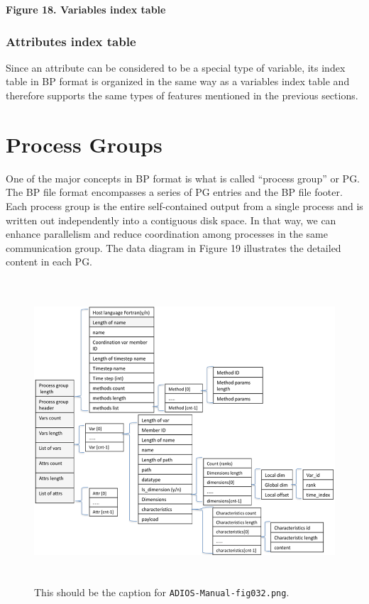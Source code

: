 \begin{center}
{\color{color20} \textbf{Figure 18. Variables index table}}
\end{center}

\subsubsection{Attributes index table}

Since an attribute can be considered to be a special type of variable, its index 
table in BP format is organized in the same way as a variables index table and 
therefore supports the same types of features mentioned in the previous sections. 

\section{Process Groups}

One of the major concepts in BP format is what is called ``process group'' or PG. 
The BP file format encompasses a series of PG entries and the BP file footer. Each 
process group is the entire self-contained output from a single process and is 
written out independently into a contiguous disk space. In that way, we can enhance 
parallelism and reduce coordination among processes in the same communication group. 
The data diagram in Figure 19 illustrates the detailed content in each PG. 

\begin{figure}[htbp]
\begin{center}
\includegraphics[width=389pt, height=321pt]{ADIOS-Manual-fig032.png}
\caption{This should be the caption for \texttt{ADIOS-Manual-fig032.png}.}
\end{center}
\end{figure}\label{HRef119578960}\label{HToc144350178}

